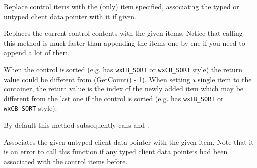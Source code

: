 
Replace control items with the (only) item specified, associating the typed or
untyped client data pointer with it if given.





Replaces the current control contents with the given items. Notice that calling
this method is much faster than appending the items one by one if you need to
append a lot of them.








When the control is sorted (e.g. has {\tt wxLB\_SORT} or {\tt wxCB\_SORT} style)
the return value could be different from (GetCount() - 1).
When setting a single item to the container, the return value is the index of the
newly added item which may be different from the last one if the control is sorted
(e.g. has {\tt wxLB\_SORT} or {\tt wxCB\_SORT} style).

By default this method subsequently calls 
and .


\label{wxcontrolwithitemssetclientdata}


Associates the given untyped client data pointer with the given item. Note that
it is an error to call this function if any typed client data pointers had been
associated with the control items before.

